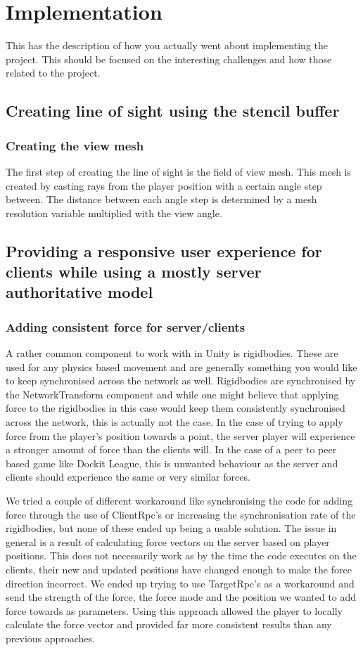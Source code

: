 \chapter{Implementation}
\label{chap:implementation}
This has the description of how you actually went about implementing the project.  This should be focused on the interesting challenges and how those related to the project.

\section{Creating line of sight using the stencil buffer}
\subsection{Creating the view mesh}
The first step of creating the line of sight is the field of view mesh. This mesh is created by casting rays from the player position with a certain angle step between. The distance between each angle step is determined by a mesh resolution variable multiplied with the view angle.

\section{Providing a responsive user experience for clients while using a mostly server authoritative model}
\subsection{Adding consistent force for server/clients}
\label{sec:conForce}
A rather common component to work with in Unity is rigidbodies. These are used for any physics based movement and are generally something you would like to keep synchronised across the network as well. Rigidbodies are synchronised by the NetworkTransform component and while one might believe that applying force to the rigidbodies in this case would keep them consistently synchronised across the network, this is actually not the case. In the case of trying to apply force from the player's position towards a point, the server player will experience a stronger amount of force than the clients will. In the case of a peer to peer based game like Dockit League, this is unwanted behaviour as the server and clients should experience the same or very similar forces.

We tried a couple of different workaround like synchronising the code for adding force through the use of ClientRpc's or increasing the synchronisation rate of the rigidbodies, but none of these ended up being a usable solution. The issue in general is a result of calculating force vectors on the server based on player positions. This does not necessarily work as by the time the code executes on the clients, their new and updated positions have changed enough to make the force direction incorrect. We ended up trying to use TargetRpc's as a workaround and send the strength of the force, the force mode and the position we wanted to add force towards as parameters. Using this approach allowed the player to locally calculate the force vector and provided far more consistent results than any previous approaches. 

